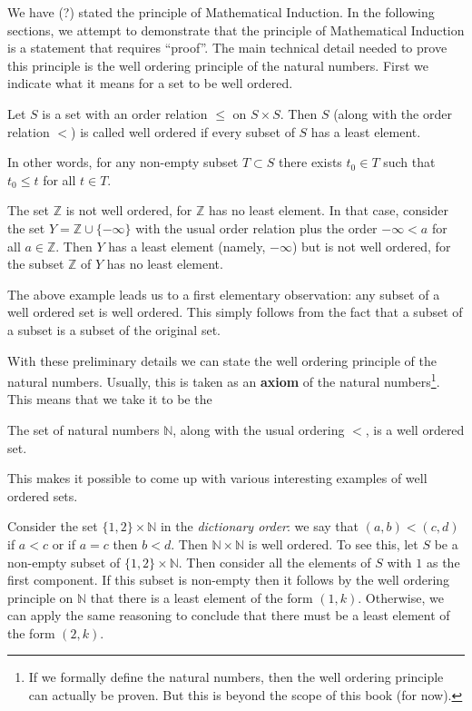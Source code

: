 We have (?) stated the principle of Mathematical Induction. In the following sections, we attempt to demonstrate that the principle of Mathematical Induction is a statement that requires ``proof''. The main technical detail needed to prove this principle is the well ordering principle of the natural numbers. First we indicate what it means for a set to be well ordered.

\begin{definition}
Let $S$ is a set with an order relation $\leq$ on $S \times S$. Then $S$ (along with the order relation $<$) is called well ordered if every subset of $S$ has a least element.
\end{definition}

In other words, for any non-empty subset $T \subset S$ there exists $t_0 \in T$ such that $t_0 \leq t$ for all $t \in T$.

\begin{example}
The set $\mathbb{Z}$ is not well ordered, for $\mathbb{Z}$ has no least element. In that case, consider the set $Y = \mathbb{Z} \cup \{-\infty\}$ with the usual order relation plus the order $-\infty < a$ for all $a \in \mathbb{Z}$. Then $Y$ has a least element (namely, $-\infty$) but is not well ordered, for the subset $\mathbb{Z}$ of $Y$ has no least element.
\end{example}

The above example leads us to a first elementary observation: any subset of a well ordered set is well ordered. This simply follows from the fact that a subset of a subset is a subset of the original set.

With these preliminary details we can state the well ordering principle of the natural numbers. Usually, this is taken as an \textbf{axiom} of the natural numbers\footnote{If we formally define the natural numbers, then the well ordering principle can actually be proven. But this is beyond the scope of this book (for now).}. This means that we take it to be the 
\begin{tcolorbox}
The set of natural numbers $\mathbb{N}$, along with the usual ordering $<$, is a well ordered set.
\end{tcolorbox}

This makes it possible to come up with various interesting examples of well ordered sets.

\begin{example}
Consider the set $\{1, 2\} \times \mathbb{N}$ in the \textit{dictionary order}: we say that $(a, b) < (c, d)$ if $a < c$ or if $a = c$ then $b < d$. Then $\mathbb{N} \times \mathbb{N}$ is well ordered. To see this, let $S$ be a non-empty subset of $\{1,2\} \times \mathbb{N}$. Then consider all the elements of $S$ with $1$ as the first component. If this subset is non-empty then it follows by the well ordering principle on $\mathbb{N}$ that there is a least element of the form $(1, k)$. Otherwise, we can apply the same reasoning to conclude that there must be a least element of the form $(2, k)$.
\end{example}


